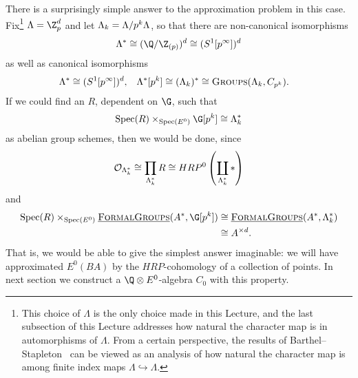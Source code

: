 There is a surprisingly simple answer to the approximation problem in this case.  Fix\footnote{This choice of \(\Lambda\) is the only choice made in this Lecture, and the last subsection of this Lecture addresses how natural the character map is in automorphisms of \(\Lambda\).  From a certain perspective, the results of Barthel--Stapleton~\cite{BarthelStapleton} can be viewed as an analysis of how natural the character map is among finite index maps \(\Lambda \hookrightarrow \Lambda\).} \(\Lambda = \Z_{p}^{d}\) and let \(\Lambda_k = \Lambda/p^k\Lambda\), so that there are non-canonical isomorphisms
\[
\Lambda^* \cong (\Q/\Z_{(p)})^d \cong (S^1[p^{\infty}])^d
\] 
as well as canonical isomorphisms
\begin{align*}
\Lambda^* & \cong (S^1[p^{\infty}])^d, &
\Lambda^*[p^k] & \cong (\Lambda_{k})^* \cong \normalfont\textsc{Groups}(\Lambda_k, C_{p^k}).
\end{align*}
If we could find an \(R\), dependent on \(\G\), such that
\[
\Spec(R) \times_{\Spec(E^0)} \G[p^k] \cong \Lk^*
\]
as abelian group schemes, then we would be done, since
\[
\mathcal{O}_{\Lambda_k^*} \cong \prod_{\Lambda_k^*} R \cong HRP^0\left(\coprod_{\Lambda_k^*} \ast\right)
\]
and
\begin{align*}
\Spec(R) \times_{\Spec(E^0)} \InternalHom{FormalGroups}(A^*, \G[p^k]) & \cong \InternalHom{FormalGroups}(A^*, \Lambda_{k}^*) \\
& \cong A^{\times d}.
\end{align*}
That is, we would be able to give the simplest answer imaginable: we will have approximated \(E^0(BA)\) by the \(HRP\)-cohomology of a collection of points. In next section we construct a \(\Q \otimes E^0\)-algebra \(C_0\) with this property.




